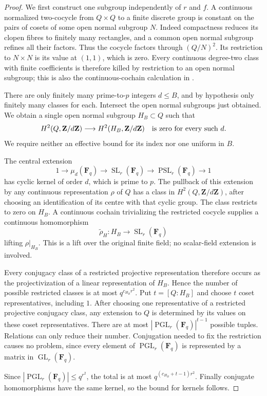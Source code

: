 \begin{proof}
We first construct one subgroup independently of $r$ and $f$. A
continuous normalized two-cocycle from $Q\times Q$ to a finite
discrete group is constant on the pairs of cosets of some open
normal subgroup $N$. Indeed compactness reduces its clopen fibres
to finitely many rectangles, and a common open normal subgroup
refines all their factors. Thus the cocycle factors through
$(Q/N)^2$. Its restriction to $N\times N$ is its value at $(1,1)$,
which is zero. Every continuous degree-two class with finite
coefficients is therefore killed by restriction to an open normal
subgroup; this is also the continuous-cochain calculation in
\citet[II, Proposition 4.2, p.~87]{MilneCFT2020D}.

There are only finitely many prime-to-$p$ integers $d\le B$, and by
hypothesis only finitely many classes for each. Intersect the open
normal subgroups just obtained. We obtain a single open normal
subgroup $H_B\subset Q$ such that
\[
 H^2(Q,\mathbf Z/d\mathbf Z)\longrightarrow
 H^2(H_B,\mathbf Z/d\mathbf Z)
 \quad\hbox{is zero for every such }d.
\]
We require neither an effective bound for its index nor one uniform
in $B$.

The central extension
\[
 1\longrightarrow\mu_d(\mathbf F_q)
 \longrightarrow\operatorname{SL}_r(\mathbf F_q)
 \longrightarrow\operatorname{PSL}_r(\mathbf F_q)
 \longrightarrow1
\]
has cyclic kernel of order $d$, which is prime to $p$. The pullback
of this extension by any continuous representation $\rho$ of $Q$
has a class in $H^2(Q,\mathbf Z/d\mathbf Z)$, after choosing an
identification of its centre with that cyclic group. The class
restricts to zero on $H_B$. A continuous cochain trivializing the
restricted cocycle supplies a continuous homomorphism
\[
 \widetilde\rho_H:H_B\longrightarrow
                   \operatorname{SL}_r(\mathbf F_q)
\]
lifting $\rho|_{H_B}$. This is a lift over the original finite
field; no scalar-field extension is involved.

Every conjugacy class of a restricted projective representation
therefore occurs as the projectivization of a linear representation
of $H_B$. Hence the number of possible restricted classes is at
most $q^{c_{H_B}r^2}$. Put $t=[Q:H_B]$ and choose $t$ coset
representatives, including $1$. After choosing one representative
of a restricted projective conjugacy class, any extension to $Q$
is determined by its values on these coset representatives. There
are at most $|\operatorname{PGL}_r(\mathbf F_q)|^{t-1}$ possible
tuples. Relations can only reduce their number. Conjugation needed
to fix the restriction causes no problem, since every element of
$\operatorname{PGL}_r(\mathbf F_q)$ is represented by a matrix in
$\operatorname{GL}_r(\mathbf F_q)$.

Since $|\operatorname{PGL}_r(\mathbf F_q)|\le q^{r^2}$, the total
is at most $q^{(c_{H_B}+t-1)r^2}$. Finally conjugate homomorphisms
have the same kernel, so the bound for kernels follows.
\end{proof}

